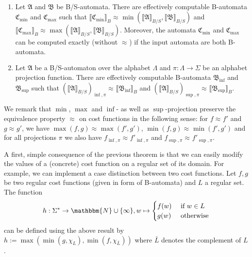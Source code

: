 \documentclass{LMCS}
\newcommand{\nat}{\mathbbm{N}}
\newcommand{\natInf}{\nat \cup \{ \infty \}}
\newcommand{\automatonA}{\mathfrak A}
\newcommand{\automatonB}{\mathfrak B}
\newcommand{\automatonC}{\mathfrak C}
\newcommand{\semantics}[1]{\llbracket#1\rrbracket}
\newcommand{\costEquiv}[1][\alpha]{\approx_{#1}}
\newcommand{\infProjection}[1]{_{\inf,#1}}
\newcommand{\supProjection}[1]{_{\sup,#1}}
\begin{document}
\begin{thm}\
\label{thm:ClosureOfRegularCostFunctions}
	\begin{enumerate}[label=(\roman*)]
		\item Let $\automatonA$ and $\automatonB$ be B/S-automata. There are
effectively computable B-automata $\automatonC_{\min}$ and
$\automatonC_{\max}$ such that $\semantics{\automatonC_{\min}}_B \costEquiv[]
\min(\semantics{\automatonA}_{B/S},\semantics{\automatonB}_{B/S})$ and
$\semantics{\automatonC_{\max}}_B \costEquiv[]
\max(\semantics{\automatonA}_{B/S},\semantics{\automatonB}_{B/S})$.
	Moreover, the automata $\automatonC_{\min}$ and $\automatonC_{\max}$ can 
	be computed exactly (without $\costEquiv[]$) if the input automata are 
	both B-automata.
		\item Let $\automatonA$ be a B/S-automaton over the alphabet $\Lambda$
and $\pi: \Lambda \to \Sigma$ be an alphabet projection function. There are
effectively computable B-automata $\automatonB_{\inf}$ and $\automatonB_{\sup}$
such that $(\semantics{\automatonA}_{B/S})\infProjection{\pi} \costEquiv[]
\semantics{\automatonB_{\inf}}_B$ and
$(\semantics{\automatonA}_{B/S})\supProjection{\pi} \costEquiv[]
\semantics{\automatonB_{\sup}}_B$.
	\end{enumerate}
\end{thm}


\noindent We remark that $\min$, $\max$ and $\inf$- as well as
$\sup$-projection preserve the equivalence property $\costEquiv[]$ on
cost functions in the following sense: for $f \costEquiv[] f'$ and $g
\costEquiv[] g'$, we have $\max(f,g) \costEquiv[] \max(f',g')$,
$\min(f,g) \costEquiv[] \min(f',g')$ and for all projections $\pi$ we
also have $f_{\inf,\pi} \costEquiv[] f'_{\inf,\pi}$ and $f_{\sup,\pi}
\costEquiv[] f'_{\sup,\pi}$.


A first, simple consequence of the previous theorem is that we can easily
modify the values of a (concrete) cost function on a regular set of its domain. For
example, we can implement a case distinction between two cost functions.
Let $f,g$ be two regular cost functions (given in form of B-automata) 
and $L$ a regular set. 
The function 
\[ h: \Sigma^* \to \natInf, w \mapsto 
	\begin{cases}
		f(w) & \text{ if } w \in L \\
		g(w) & \text{ otherwise}
	\end{cases}
\]
can be defined using the above result by $h :=
\max(\min(g,\chi_L),\min(f,\chi_{\bar L}))$ where $\bar L$ denotes the
complement of $L$. 
\end{document}
